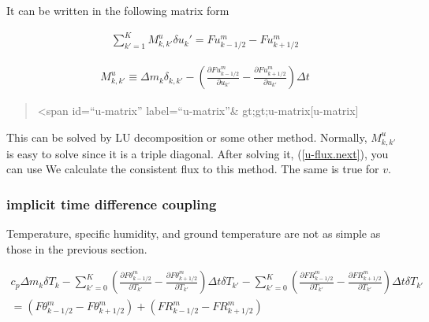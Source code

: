 It can be written in the following matrix form

\begin{eqnarray}
  \sum_{k'=1}^{K} M^u_{k,k'} \delta u_k' = Fu^{m}_{k-1/2} - Fu^{m}_{k+1/2}
\end{eqnarray}

\begin{eqnarray}
M^u_{k,k'} \equiv \Delta m_k \delta_{k,k'}
          -  \left(  \frac{\partial Fu^{m}_{k-1/2}}{\partial u_{k'}}
                   - \frac{\partial Fu^{m}_{k+1/2}}{\partial u_{k'}} \right) \Delta t
\end{eqnarray}

\begin{quote}
\textless span id=``u-matrix'' label=``u-matrix''\&
gt;gt;u-matrix{[}u-matrix{]}
\end{quote}

This can be solved by LU decomposition or some other method. Normally,
\(M^u_{k,k'}\) is easy to solve since it is a triple diagonal. After
solving it, ({[}\protect\hyperlink{u-flux.next}{u-flux.next{]}}), you
can use We calculate the consistent flux to this method. The same is
true for \(v\).

\hypertarget{implicit-time-difference-coupling}{%
\subsubsection{implicit time difference
coupling}\label{implicit-time-difference-coupling}}

Temperature, specific humidity, and ground temperature are not as simple
as those in the previous section.

\begin{eqnarray}
  c_p \Delta m_k \delta T_k
   -  \sum_{k'=0}^{K}
                 \left(  \frac{\partial F\theta^{m}_{k-1/2}}{\partial T_{k'}}
                       - \frac{\partial F\theta^{m}_{k+1/2}}{\partial T_{k'}} \right)
                 \Delta t\delta T_{k'}
  - \sum_{k'=0}^{K}
                 \left(  \frac{\partial FR^{m}_{k-1/2}}{\partial T_{k'}}
                       - \frac{\partial FR^{m}_{k+1/2}}{\partial T_{k'}} \right)
                 \Delta t\delta T_{k'}  \\
  =   ( F\theta^{m}_{k-1/2} - F\theta^{m}_{k+1/2} )
  + ( FR^{m}_{k-1/2} - FR^{m}_{k+1/2} )
\end{eqnarray}

\begin{quote}
\end{quote}

